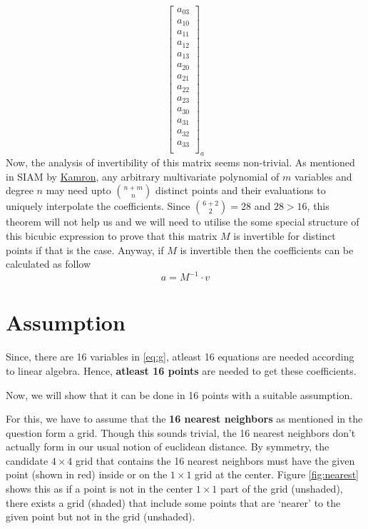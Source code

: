 \documentclass[a4paper, landscape]{article}
\begin{document}
\begin{equation}
{\begin{bmatrix}
    a_{03}\\
    a_{10}\\
    a_{11}\\
    a_{12}\\
    a_{13}\\
    a_{20}\\
    a_{21}\\
    a_{22}\\
    a_{23}\\
    a_{30}\\
    a_{31}\\
    a_{32}\\
    a_{33}\\
    \end{bmatrix}
    }_{a}\label{eq:g}
\end{equation}
Now, the analysis of invertibility of this matrix seems non-trivial. As mentioned in SIAM by \href{https://evoq-n.org/Portals/0/Publications/SIURO/Vol1_Issue1/A_Simple_Expression_for_Multivariate.pdf}{Kamron}, any arbitrary multivariate polynomial of $m$ variables and degree $n$ may need upto $\binom{n+m}{n}$ distinct points and their evaluations to uniquely interpolate the coefficients. Since $\binom{6+2}{2}=28$ and $28>16$, this theorem will not help us and we will need to utilise the some special structure of this bicubic expression to prove that this matrix $M$ is invertible for distinct points if that is the case. Anyway, if $M$ is invertible then the coefficients can be calculated as follow
\begin{equation}
    a = M^{-1}\cdot v
\end{equation}
\section{Assumption}
Since, there are 16 variables in \ref{eq:g}, {atleast 16 equations} are needed according to linear algebra. Hence, \textbf{atleast 16 points} are needed to get these coefficients.

Now, we will show that it can be done in 16 points with a suitable assumption.

For this, we have to assume that the \textbf{16 nearest neighbors} as mentioned in the question form a grid. Though this sounds trivial, the 16 nearest neighbors don't actually form in our usual notion of euclidean distance. By symmetry, the candidate $4\times4$ grid that contains the 16 nearest neighbors must have the given point (shown in red) inside or on the $1\times1$ grid at the center. Figure \ref{fig:nearest} shows this as if a point is not in the center $1\times1$ part of the grid (unshaded), there exists a grid (shaded) that include some points that are `nearer' to the given point but not in the grid (unshaded). 
\end{document}
